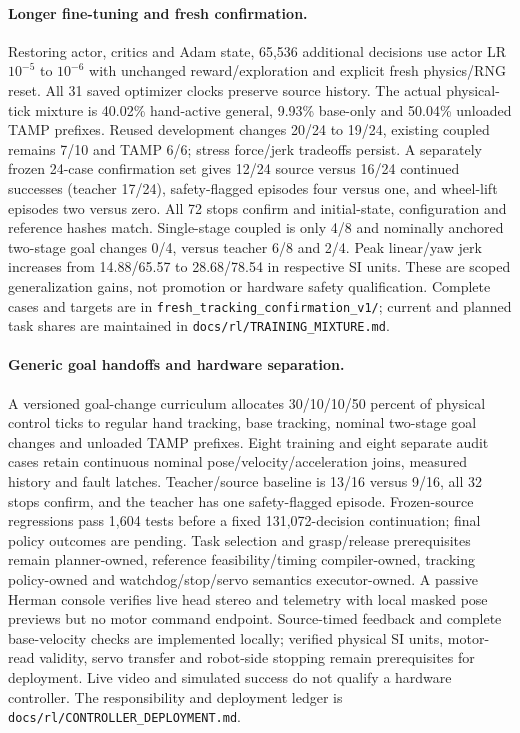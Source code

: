 \paragraph{Longer fine-tuning and fresh confirmation.}
Restoring actor, critics and Adam state, 65,536 additional decisions use actor
LR $10^{-5}$ to $10^{-6}$ with unchanged reward/exploration and explicit fresh
physics/RNG reset. All 31 saved optimizer clocks preserve source history.
The actual physical-tick mixture is 40.02\% hand-active general, 9.93\% base-only
and 50.04\% unloaded TAMP prefixes. Reused development changes 20/24 to 19/24,
existing coupled remains 7/10 and TAMP 6/6; stress force/jerk tradeoffs persist.
A separately frozen 24-case confirmation set gives 12/24 source versus 16/24
continued successes (teacher 17/24), safety-flagged episodes four versus one,
and wheel-lift episodes two versus zero. All 72 stops confirm and initial-state,
configuration and reference hashes match. Single-stage coupled is only 4/8 and
nominally anchored two-stage goal changes 0/4, versus teacher 6/8 and 2/4.
Peak linear/yaw jerk increases from 14.88/65.57 to 28.68/78.54 in respective SI
units. These are scoped generalization gains, not promotion or hardware safety
qualification. Complete cases and targets are in
\texttt{fresh\_tracking\_confirmation\_v1/}; current and planned task shares are
maintained in \texttt{docs/rl/TRAINING\_MIXTURE.md}.

\paragraph{Generic goal handoffs and hardware separation.}
A versioned goal-change curriculum allocates 30/10/10/50 percent of physical
control ticks to regular hand tracking, base tracking, nominal two-stage goal
changes and unloaded TAMP prefixes. Eight training and eight separate audit
cases retain continuous nominal pose/velocity/acceleration joins, measured
history and fault latches. Teacher/source baseline is 13/16 versus 9/16, all
32 stops confirm, and the teacher has one safety-flagged episode. Frozen-source
regressions pass 1,604 tests before a fixed 131,072-decision continuation;
final policy outcomes are pending. Task selection and grasp/release prerequisites
remain planner-owned, reference feasibility/timing compiler-owned, tracking
policy-owned and watchdog/stop/servo semantics executor-owned.
A passive Herman console verifies live head stereo and telemetry with local
masked pose previews but no motor command endpoint. Source-timed feedback and
complete base-velocity checks are implemented locally; verified physical SI
units, motor-read validity, servo transfer and robot-side stopping remain
prerequisites for deployment. Live video and simulated success do not qualify
a hardware controller. The responsibility and deployment ledger is
\texttt{docs/rl/CONTROLLER\_DEPLOYMENT.md}.
